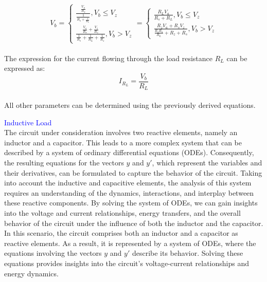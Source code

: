 \begin{equation}
    V_b=\begin{cases}
        \frac{\frac{V_a}{R_s}}{\frac{1}{R_s+\frac{1}{R_L}}}, V_b \leq V_z\\
        \frac{\frac{V_a}{R_s}+\frac{V_z}{R_z}}{\frac{1}{R_s}+\frac{1}{R_L}+\frac{1}{R_z}}, V_b>V_z
    \end{cases}=\begin{cases}
        \frac{R_LV_a}{R_s+R_L}, V_b \leq V_z\\
        \frac{R_zV_a+R_sV_z}{\frac{R_zR_s}{R_L}+R_z+R_s}, V_b>V_z
    \end{cases}
\end{equation}\\

The expression for the current flowing through the load resistance $R_L$ can be expressed as:\\

\begin{equation}
    I_{R_L}=\frac{V_b}{R_L}
\end{equation}\\

All other parameters can be determined using the previously derived equations.

\textcolor{blue}{Inductive Load}\\

 The circuit under consideration involves two reactive elements, namely an inductor and a capacitor. This leads to a more complex system that can be described by a system of ordinary differential equations (ODEs). Consequently, the resulting equations for the vectors $y$ and $y'$, which represent the variables and their derivatives, can be formulated to capture the behavior of the circuit. Taking into account the inductive and capacitive elements, the analysis of this system requires an understanding of the dynamics, interactions, and interplay between these reactive components. By solving the system of ODEs, we can gain insights into the voltage and current relationships, energy transfers, and the overall behavior of the circuit under the influence of both the inductor and the capacitor.\\

In this scenario, the circuit comprises both an inductor and a capacitor as reactive elements. As a result, it is represented by a system of ODEs, where the equations involving the vectors $y$ and $y'$ describe its behavior. Solving these equations provides insights into the circuit's voltage-current relationships and energy dynamics.\\

